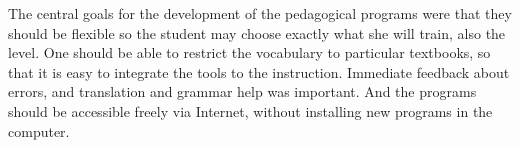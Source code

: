 \documentclass[11pt]{article}
\begin{document}


%
%

The central goals for the development of the pedagogical programs were that they should be flexible so the student may choose exactly what she will train, also the level. One should be able to restrict the vocabulary to particular textbooks, so that it is easy to integrate the tools to the instruction. Immediate feedback about errors, and translation and grammar help was important. And the programs should be accessible freely via Internet, without installing new programs in the computer.
\end{document}
